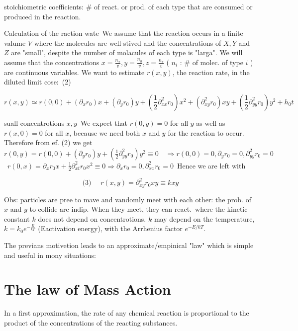 stoichiometric coefficients: # of react. or prod. of each type that are consumed or produced in the reaction.

Calculation of the raction wate\
We assume that the reaction occurs in a finite valume $V$ where the molecules are well-stived and the concentrations of $X, Y$ and $Z$ are "small", despite the number of molacules of each type is "larga". We will assume that the concentrations $x=\frac{n_{x}}{v}, y=\frac{n_{y}}{v}, z=\frac{n_{z}}{v}$ ( $n_{i}$ : # of molec. of type $i$ ) are continuous variables. We want to estimate $r(x, y)$, the reaction rate, in the diluted limit cose:\
(2)

$$ 
r(x, y) \simeq r(0,0)+\left(\partial_{x} r_{0}\right) x+\left(\partial_{y} r_{0}\right) y+\left(\frac{1}{2} \partial_{x x}^{2} r_{0}\right) x^{2}+\left(\partial_{x y}^{2} r_{0}\right) x y+\left(\frac{1}{2} \partial_{y y}^{2} r_{0}\right) y^{2}+h_{0} t 
$$ 

suall concentrotions $x, y$\
We expect that $r(0, y)=0$ for all $y$ as well as $r(x, 0)=0$ for all $x$, because we need both $x$ and $y$ for the reaction to occur. Therefore from ef. (2) we get\
$r(0, y)=r(0,0)+\left(\partial_{y} r_{0}\right) y+\left(\frac{1}{2} \partial_{y y}^{2} r_{0}\right) y^{2} \equiv 0 \quad \Rightarrow r(0,0)=0, \partial_{y} r_{0}=0, \partial_{y y}^{2} r_{0}=0$\
$r(0, x)=\partial_{x} r_{0} x+\frac{1}{2} \partial_{x t}^{2} r_{0} x^{2} \equiv 0 \Rightarrow \partial_{x} r_{0}=0, \partial_{x x}^{2} r_{0}=0$\
Hence we are left with

$$ 
 \text { (3) } \quad r(x, y)=\partial_{x y}^{2} r_{0} x y \equiv k x y 
$$ 

Obs: particles are pree to mave and vandomly meet with each other: the prob. of $x$ and $y$ to collide are indip. When they meet, they can react.\
where the kinetic constant $k$ does not depend on concentrotions. $k$ may depend on the temperature, $k=k_{0} e^{-\frac{E}{k T}}$ (Eactivation energy), with the Arrhenius factor $e^{-E / k T}$.

The previans motivetion leads to an approximate/empinical "law" which is simple and useful in mony situations:

\section*{The law of Mass Action}
In a first approximation, the rate of any chemical reaction is proportional to the product of the concentrations of the reacting substances.


